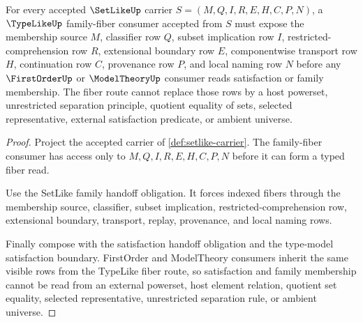 \begin{theorem}
\label{thm:setlike-family-fiber-obligations}
For every accepted $\SetLikeUp$ carrier $S=(M,Q,I,R,E,H,C,P,N)$, a $\TypeLikeUp$ family-fiber consumer accepted from $S$ must expose the membership source $M$, classifier row $Q$, subset implication row $I$, restricted-comprehension row $R$, extensional boundary row $E$, componentwise transport row $H$, continuation row $C$, provenance row $P$, and local naming row $N$ before any $\FirstOrderUp$ or $\ModelTheoryUp$ consumer reads satisfaction or family membership. The fiber route cannot replace those rows by a host powerset, unrestricted separation principle, quotient equality of sets, selected representative, external satisfaction predicate, or ambient universe.
\end{theorem}
\begin{proof}
Project the accepted carrier of \autoref{def:setlike-carrier}. The family-fiber consumer has access only to $M,Q,I,R,E,H,C,P,N$ before it can form a typed fiber read.

Use the SetLike family handoff obligation. It forces indexed fibers through the membership source, classifier, subset implication, restricted-comprehension row, extensional boundary, transport, replay, provenance, and local naming rows.

Finally compose with the satisfaction handoff obligation and the type-model satisfaction boundary. FirstOrder and ModelTheory consumers inherit the same visible rows from the TypeLike fiber route, so satisfaction and family membership cannot be read from an external powerset, host element relation, quotient set equality, selected representative, unrestricted separation rule, or ambient universe.
\end{proof}

